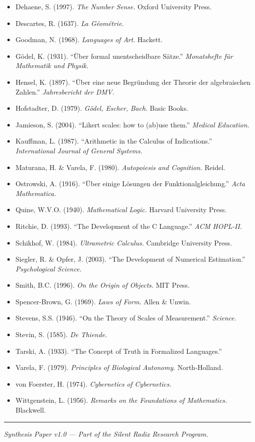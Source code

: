 \documentclass[
]{article}
\providecommand{\tightlist}{%
  \setlength{\itemsep}{0pt}\setlength{\parskip}{0pt}}
\begin{document}
\begin{itemize}
\tightlist
\item
  Dehaene, S. (1997). \emph{The Number Sense.} Oxford University Press.
\item
  Descartes, R. (1637). \emph{La Géométrie.}
\item
  Goodman, N. (1968). \emph{Languages of Art.} Hackett.
\item
  Gödel, K. (1931). ``Über formal unentscheidbare Sätze.''
  \emph{Monatshefte für Mathematik und Physik.}
\item
  Hensel, K. (1897). ``Über eine neue Begründung der Theorie der
  algebraischen Zahlen.'' \emph{Jahresbericht der DMV.}
\item
  Hofstadter, D. (1979). \emph{Gödel, Escher, Bach.} Basic Books.
\item
  Jamieson, S. (2004). ``Likert scales: how to (ab)use them.''
  \emph{Medical Education.}
\item
  Kauffman, L. (1987). ``Arithmetic in the Calculus of Indications.''
  \emph{International Journal of General Systems.}
\item
  Maturana, H. \& Varela, F. (1980). \emph{Autopoiesis and Cognition.}
  Reidel.
\item
  Ostrowski, A. (1916). ``Über einige Lösungen der
  Funktionalgleichung.'' \emph{Acta Mathematica.}
\item
  Quine, W.V.O. (1940). \emph{Mathematical Logic.} Harvard University
  Press.
\item
  Ritchie, D. (1993). ``The Development of the C Language.'' \emph{ACM
  HOPL-II.}
\item
  Schikhof, W. (1984). \emph{Ultrametric Calculus.} Cambridge University
  Press.
\item
  Siegler, R. \& Opfer, J. (2003). ``The Development of Numerical
  Estimation.'' \emph{Psychological Science.}
\item
  Smith, B.C. (1996). \emph{On the Origin of Objects.} MIT Press.
\item
  Spencer-Brown, G. (1969). \emph{Laws of Form.} Allen \& Unwin.
\item
  Stevens, S.S. (1946). ``On the Theory of Scales of Measurement.''
  \emph{Science.}
\item
  Stevin, S. (1585). \emph{De Thiende.}
\item
  Tarski, A. (1933). ``The Concept of Truth in Formalized Languages.''
\item
  Varela, F. (1979). \emph{Principles of Biological Autonomy.}
  North-Holland.
\item
  von Foerster, H. (1974). \emph{Cybernetics of Cybernetics.}
\item
  Wittgenstein, L. (1956). \emph{Remarks on the Foundations of
  Mathematics.} Blackwell.
\end{itemize}

\begin{center}\rule{0.5\linewidth}{0.5pt}\end{center}

\emph{Synthesis Paper v1.0 --- Part of the Silent Radix Research
Program.}
\end{document}
